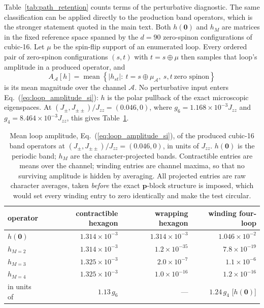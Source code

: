 \documentclass[aps,prl,onecolumn,amsmath,amssymb]{revtex4-2}
\newcommand{\Jzz}{J_{zz}}
\newcommand{\Jpm}{J_{\pm}}
\newcommand{\Jpp}{J_{\pm\pm}}
\begin{document}
Table~\ref{tab:path_retention} counts terms of the perturbative diagnostic.
The same classification can be applied directly to the production band
operators, which is the stronger statement quoted in the main text.  Both
$h(\bm0)$ and $h_M$ are matrices in the fixed reference space spanned by the
$d=90$ zero-spinon configurations of cubic-16.  Let $\mu$ be the spin-flip
support of an enumerated loop.  Every ordered pair of zero-spinon
configurations $(s,t)$ with $t=s\oplus\mu$ then samples that loop's amplitude
in a produced operator, and
\begin{equation}
 A_{\mathcal A}[h]=
 \operatorname{mean}\left\{\left|h_{st}\right|:\
 t=s\oplus\mu_{\mathcal A},\ s,t\ \text{zero spinon}\right\}
\label{eq:loop_amplitude_si}
\end{equation}
is its mean magnitude over the channel $\mathcal A$.  No perturbative input
enters Eq.~(\ref{eq:loop_amplitude_si}): $h$ is the polar pullback of the
exact microscopic eigenspaces.  At $(\Jpm,\Jpp)/\Jzz=(0.046,0)$, where
$g_6=1.168\times10^{-3}\Jzz$ and $g_4=8.464\times10^{-3}\Jzz$, this gives
Table~\ref{tab:loop_amplitudes}.
\begin{table}[htbp]
\caption{Mean loop amplitude, Eq.~(\ref{eq:loop_amplitude_si}), of the
produced cubic-16 band operators at $(\Jpm,\Jpp)/\Jzz=(0.046,0)$, in units of
$\Jzz$.  $h(\bm0)$ is the periodic band; $h_{M}$ are the character-projected
bands.  Contractible entries are means over the channel; winding entries are
channel maxima, so that no surviving amplitude is hidden by averaging.  All
projected entries are raw character averages, taken \emph{before} the exact
$\bm p$-block structure is imposed, which would set every winding entry to
zero identically and make the test circular.}
\label{tab:loop_amplitudes}
\centering
\begin{tabular}{lrrr}
\toprule
operator & contractible hexagon & wrapping hexagon & winding four-loop\\
\midrule
$h(\bm0)$ & $1.314\times10^{-3}$ & $1.314\times10^{-3}$ & $1.046\times10^{-2}$\\
$h_{M=2}$ & $1.314\times10^{-3}$ & $1.2\times10^{-35}$ & $7.8\times10^{-19}$\\
$h_{M=3}$ & $1.325\times10^{-3}$ & $2.0\times10^{-7}$ & $1.1\times10^{-6}$\\
$h_{M=4}$ & $1.325\times10^{-3}$ & $1.0\times10^{-16}$ & $1.2\times10^{-16}$\\
\midrule
in units of & $1.13\,g_6$ & --- & $1.24\,g_4$ [$h(\bm0)$]\\
\bottomrule
\end{tabular}
\end{table}
\end{document}
